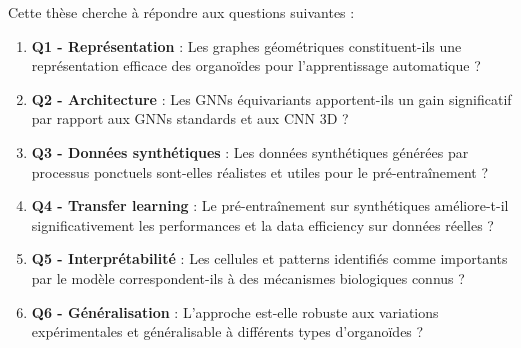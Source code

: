 Cette thèse cherche à répondre aux questions suivantes :

\begin{enumerate}
    \item \textbf{Q1 - Représentation} : Les graphes géométriques constituent-ils une représentation efficace des organoïdes pour l'apprentissage automatique ?
    
    \item \textbf{Q2 - Architecture} : Les GNNs équivariants apportent-ils un gain significatif par rapport aux GNNs standards et aux CNN 3D ?
    
    \item \textbf{Q3 - Données synthétiques} : Les données synthétiques générées par processus ponctuels sont-elles réalistes et utiles pour le pré-entraînement ?
    
    \item \textbf{Q4 - Transfer learning} : Le pré-entraînement sur synthétiques améliore-t-il significativement les performances et la data efficiency sur données réelles ?
    
    \item \textbf{Q5 - Interprétabilité} : Les cellules et patterns identifiés comme importants par le modèle correspondent-ils à des mécanismes biologiques connus ?
    
    \item \textbf{Q6 - Généralisation} : L'approche est-elle robuste aux variations expérimentales et généralisable à différents types d'organoïdes ?
\end{enumerate}
